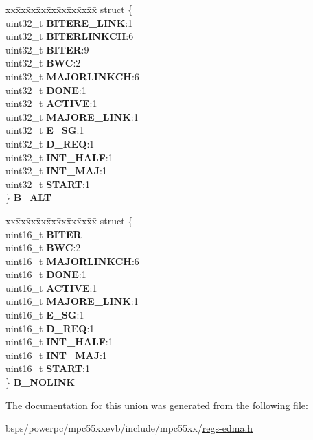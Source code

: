 \begin{DoxyCompactItemize}
\begin{tabbing}
\end{tabbing}\item 
\mbox{\label{unionEDMA__tag_1_1tcd__t_1_1tcd__BMF__tag_a1efc1a2ae13313ec227b98d040d8be5d}} 
\begin{tabbing}
xx\=xx\=xx\=xx\=xx\=xx\=xx\=xx\=xx\=\kill
struct \{\\
\>uint32\_t {\bfseries BITERE\_LINK}:1\\
\>uint32\_t {\bfseries BITERLINKCH}:6\\
\>uint32\_t {\bfseries BITER}:9\\
\>uint32\_t {\bfseries BWC}:2\\
\>uint32\_t {\bfseries MAJORLINKCH}:6\\
\>uint32\_t {\bfseries DONE}:1\\
\>uint32\_t {\bfseries ACTIVE}:1\\
\>uint32\_t {\bfseries MAJORE\_LINK}:1\\
\>uint32\_t {\bfseries E\_SG}:1\\
\>uint32\_t {\bfseries D\_REQ}:1\\
\>uint32\_t {\bfseries INT\_HALF}:1\\
\>uint32\_t {\bfseries INT\_MAJ}:1\\
\>uint32\_t {\bfseries START}:1\\
\} {\bfseries B\_ALT}\\

\end{tabbing}\item 
\mbox{\label{unionEDMA__tag_1_1tcd__t_1_1tcd__BMF__tag_a499bb57a38b3d77524064fa82856d066}} 
\begin{tabbing}
xx\=xx\=xx\=xx\=xx\=xx\=xx\=xx\=xx\=\kill
struct \{\\
\>uint16\_t {\bfseries BITER}\\
\>uint16\_t {\bfseries BWC}:2\\
\>uint16\_t {\bfseries MAJORLINKCH}:6\\
\>uint16\_t {\bfseries DONE}:1\\
\>uint16\_t {\bfseries ACTIVE}:1\\
\>uint16\_t {\bfseries MAJORE\_LINK}:1\\
\>uint16\_t {\bfseries E\_SG}:1\\
\>uint16\_t {\bfseries D\_REQ}:1\\
\>uint16\_t {\bfseries INT\_HALF}:1\\
\>uint16\_t {\bfseries INT\_MAJ}:1\\
\>uint16\_t {\bfseries START}:1\\
\} {\bfseries B\_NOLINK}\\

\end{tabbing}\end{DoxyCompactItemize}


The documentation for this union was generated from the following file\+:\begin{DoxyCompactItemize}
\item 
bsps/powerpc/mpc55xxevb/include/mpc55xx/\mbox{\hyperlink{regs-edma_8h}{regs-\/edma.\+h}}\end{DoxyCompactItemize}
